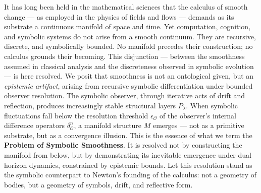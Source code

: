 \begin{scholium}
\label{scholium:bk1_resolution_of_continuum_disjunction}
It has long been held in the mathematical sciences that the calculus of smooth change — as employed in the physics of fields and flows — demands as its substrate a continuous manifold of space and time.
Yet computation, cognition, and symbolic systems do not arise from a smooth continuum. They are recursive, discrete, and symbolically bounded. No manifold precedes their construction; no calculus grounds their becoming.
This disjunction — between the smoothness assumed in classical analysis and the discreteness observed in symbolic evolution — is here resolved.
We posit that smoothness is not an ontological given, but an \textit{epistemic artifact}, arising from recursive symbolic differentiation under bounded observer resolution. The symbolic observer, through iterative acts of drift and reflection, produces increasingly stable structural layers $P_\lambda$. When symbolic fluctuations fall below the resolution threshold $\epsilon_{\mathcal{O}}$ of the observer's internal difference operators $\delta^n_{\mathcal{O}}$, a manifold structure $M$ emerges — not as a primitive substrate, but as a convergence illusion.
This is the essence of what we term the \textbf{Problem of Symbolic Smoothness}.
It is resolved not by constructing the manifold from below, but by demonstrating its inevitable emergence under dual horizon dynamics, constrained by epistemic bounds.
Let this resolution stand as the symbolic counterpart to Newton's founding of the calculus: not a geometry of bodies, but a geometry of symbols, drift, and reflective form.
\end{scholium}
